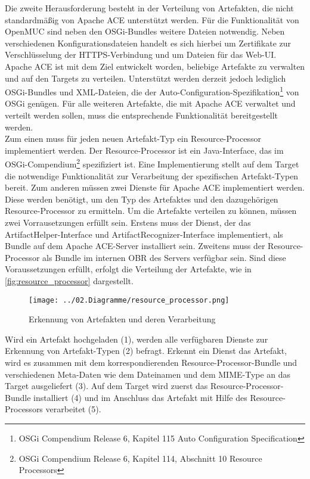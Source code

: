 Die zweite Herausforderung besteht in der Verteilung von Artefakten, die nicht standardmäßig von Apache ACE unterstützt werden.
Für die Funktionalität von OpenMUC sind neben den \ac{OSGi}-Bundles weitere Dateien notwendig. 
Neben verschiedenen Konfigurationsdateien handelt es sich hierbei um Zertifikate zur Verschlüsselung der \linebreak \ac{HTTPS}-Verbindung und um Dateien für das Web-UI.
Apache ACE ist mit dem Ziel entwickelt worden, beliebige Artefakte zu verwalten und auf den Targets zu verteilen.
Unterstützt werden derzeit jedoch lediglich \ac{OSGi}-Bundles und XML-Dateien, die der 
Auto-Configuration-Spezifikation\footnote{OSGi Compendium Release 6, Kapitel 115 Auto Configuration Specification} von \ac{OSGi} genügen.
Für alle weiteren Artefakte, die mit Apache ACE verwaltet und verteilt werden sollen, muss die entsprechende Funktionalität bereitgestellt werden.\\

Zum einen muss für jeden neuen Artefakt-Typ ein Resource-Processor implementiert werden.
Der Resource-Processor ist ein Java-Interface, das im \ac{OSGi}-Compendium\footnote{OSGi Compendium Release 6, Kapitel 114, Abschnitt 10 Resource Processors} spezifiziert ist. 
Eine Implementierung stellt auf dem Target die notwendige Funktionalität zur Verarbeitung der spezifischen Artefakt-Typen bereit.
Zum anderen müssen zwei Dienste für Apache ACE implementiert werden.
Diese werden benötigt, um den Typ des Artefaktes und den dazugehörigen Resource-Processor zu ermitteln.
Um die Artefakte verteilen zu können, müssen zwei Vorrausetzungen erfüllt sein.
Erstens muss der Dienst, der das ArtifactHelper-Interface und ArtifactRecognizer-Interface implementiert, als Bundle auf dem Apache ACE-Server installiert sein.
Zweitens muss der Resource-Processor als Bundle im internen \ac{OBR} des Servers verfügbar sein.
Sind diese Voraussetzungen erfüllt, erfolgt die Verteilung der Artefakte, wie in \autoref{fig:resource_processor} dargestellt.

\begin{figure}[h]
 \centering
 \texttt{[image: ../02.Diagramme/resource\_processor.png]}
 \caption{Erkennung von Artefakten und deren Verarbeitung}
 \label{fig:resource_processor}
\end{figure}

Wird ein Artefakt hochgeladen (1), werden alle verfügbaren Dienste zur Erkennung von Artefakt-Typen (2) befragt. 
Erkennt ein Dienst das Artefakt, wird es zusammen mit dem korrespondierenden Resource-Processor-Bundle und
verschiedenen Meta-Daten wie dem Dateinamen und dem MIME-Type an das Target ausgeliefert (3).
Auf dem Target wird zuerst das Resource-Processor-Bundle installiert (4) und im Anschluss das Artefakt mit Hilfe des Resource-Processors verarbeitet (5).\\

